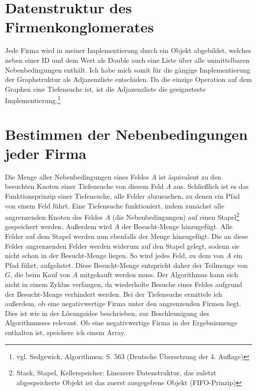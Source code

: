 \section{Datenstruktur des Firmenkonglomerates}
Jede Firma wird in meiner Implementierung durch ein Objekt abgebildet, welches neben einer ID und dem Wert als Double auch eine Liste über alle unmittelbaren Nebenbedingungen enthält. Ich habe mich somit für die gängige Implementierung der Graphstruktur als Adjazenzliste entschiden. Da die einzige Operation auf dem Graphen eine Tiefensuche ist, ist die Adjazenzliste die geeigneteste Implementierung.\footnote{vgl. Sedgewick, Algorithmen: S. 563 (Deutsche Übersetzung der 4. Auflage)}

\section{Bestimmen der Nebenbedingungen jeder Firma}
Die Menge aller Nebenbedingungen eines Feldes \(A\) ist äquivalent zu den besuchten Knoten einer Tiefensuche von diesem Feld \(A\) aus. Schließlich ist es das Funktionsprinzip einer Tiefensuche, alle Felder abzusuchen, zu denen ein Pfad von einem Feld führt. Eine Tiefensuche funktioniert, indem zunächst alle angrenzenden Knoten des Feldes \(A\) (die Nebenbedingungen) auf einen Stapel\footnote{Stack, Stapel, Kellerspeicher: Linearere Datenstruktur, das zuletzt abgespeicherte Objekt ist das zuerst ausgegebene Objekt (FIFO-Prinzip)} gespeichert werden.
Außerdem wird \(A\) der Besucht-Menge hinzugefügt. Alle Felder auf dem Stapel werden nun ebenfalls der Menge hinzugefügt. Die an diese Felder angrenzenden Felder werden widerum auf den Stapel gelegt, sodenn sie nicht schon in der Besucht-Menge liegen. So wird jedes Feld, zu dem von \(A\) ein Pfad führt, aufgelistet. Diese Besucht-Menge entspricht daher der Teilmenge von \(G\), die beim Kauf von \(A\) mitgekauft werden muss. Der Algorithmus kann sich nicht in einem Zyklus verfangen, da wiederholte Besuche eines Feldes aufgrund der Besucht-Menge verhindert werden.  Bei der Tiefensuche ermittele ich außerdem, ob eine negativwertige Firma unter den angrenzenden Firmen liegt. Dies ist wie in der Lösungsidee beschrieben, zur Beschleunigung des Algorithmusses relevant. Ob eine negativwertige Firma in der Ergebnismenge enthalten ist, speichere ich einem Array.

